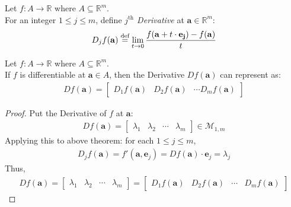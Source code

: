 \documentclass[twoside,openright]{report}
\begin{document}
\begin{definition}
    Let $f:A \to \mathbb{R}$ where $A \subseteq \mathbb{R}^m$. \\
    For an integer $1 \leq j \leq m$, define \textit{$j^{\text{th}}$ Derivative} at $\mathbf{a} \in \mathbb{R}^m$:
    \begin{align*}
        D_j f(\mathbf{a}) \overset{\textnormal{def}}{=} \lim_{t \to 0} \frac{f(\mathbf{a} + t \cdot \mathbf{e_j}) - f(\mathbf{a})}{t}
    \end{align*}
\end{definition}

\begin{theorem}
    Let $f:A \to \mathbb{R}$ where $A \subseteq \mathbb{R}^m$. \\
    If $f$ is differentiable at $\mathbf{a} \in A$, then the Derivative $Df(\mathbf{a})$ can represent as:
    \begin{align*}
        Df(\mathbf{a}) = \begin{bmatrix}
            D_1 f(\mathbf{a}) &
            D_2 f(\mathbf{a}) &
            \cdots
            D_m f(\mathbf{a})
        \end{bmatrix}
    \end{align*}
\end{theorem}
\begin{proof}
    Put the Derivative of $f$ at $\mathbf{a}$:
    \begin{align*}
        Df(\mathbf{a}) = \begin{bmatrix}
            \lambda_1 & \lambda_2 & \cdots & \lambda_m
        \end{bmatrix}
        \in \mathcal{M}_{1, m}
    \end{align*}
    Applying this to above theorem: for each $1 \leq j \leq m$,
    \begin{align*}
        D_j f(\mathbf{a})
        = f'(\mathbf{a}, \mathbf{e}_j)
        = Df(\mathbf{a}) \cdot \mathbf{e}_j
        = \lambda_j
    \end{align*}
    Thus,
    \begin{align*}
        Df(\mathbf{a})
        =
        \begin{bmatrix}
            \lambda_1 & \lambda_2 & \cdots & \lambda_m
        \end{bmatrix}
        =
        \begin{bmatrix}
            D_1 f(\mathbf{a}) & D_2 f(\mathbf{a}) & \cdots & D_m f(\mathbf{a})
        \end{bmatrix}
    \end{align*}
\end{proof}
\end{document}
